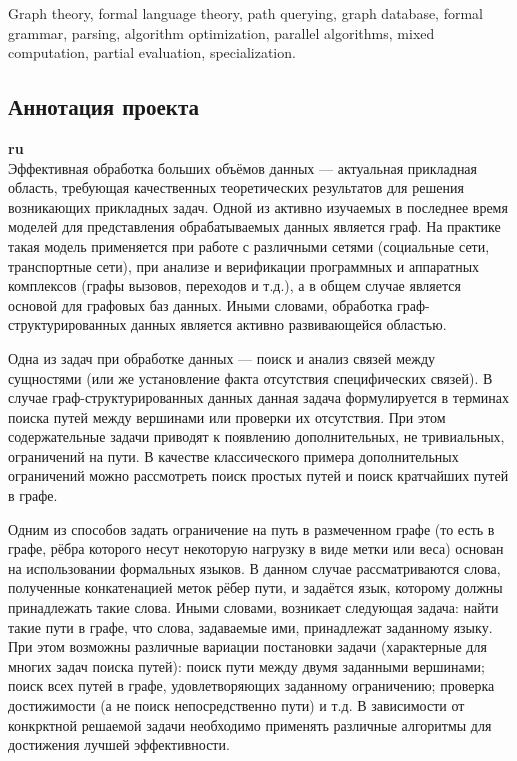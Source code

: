 \documentclass[12pt]{article}  %
\theoremstyle{remark}
\begin{document}
Graph theory, formal language theory, path querying, graph database, formal grammar, parsing, algorithm optimization, parallel algorithms, mixed computation, partial evaluation, specialization.



\subsection{Аннотация проекта}
\textbf{ru}\\
%
Эффективная обработка больших объёмов данных --- актуальная прикладная область, требующая качественных теоретических результатов для решения возникающих прикладных задач.
Одной из активно изучаемых в последнее время моделей для представления обрабатываемых данных является граф.
На практике такая модель применяется при работе с различными сетями (социальные сети, транспортные сети), при анализе и верификации программных и аппаратных комплексов (графы вызовов, переходов и т.д.), а в общем случае является основой для графовых баз данных.
Иными словами, обработка граф-структурированных данных является активно развивающейся областью.

Одна из задач при обработке данных --- поиск и анализ связей между сущностями (или же установление факта отсутствия специфических связей).
В случае граф-структурированных данных данная задача формулируется в терминах поиска путей между вершинами или проверки их отсутствия.
При этом содержательные задачи приводят к появлению дополнительных, не тривиальных, ограничений на пути.
В качестве классического примера дополнительных ограничений можно рассмотреть поиск простых путей и поиск кратчайших путей в графе.

Одним из способов задать ограничение на путь в размеченном графе (то есть в графе, рёбра которого несут некоторую нагрузку в виде метки или веса) основан на использовании формальных языков.
В данном случае рассматриваются слова, полученные конкатенацией меток рёбер пути, и задаётся язык, которому должны принадлежать такие слова.
Иными словами, возникает следующая задача: найти такие пути в графе, что слова, задаваемые ими, принадлежат заданному языку.
При этом возможны различные вариации постановки задачи (характерные для многих задач поиска путей): поиск пути между двумя заданными вершинами; поиск всех путей в графе, удовлетворяющих заданному ограничению; проверка достижимости (а не поиск непосредственно пути) и т.д.
В зависимости от конкрктной решаемой задачи необходимо применять различные алгоритмы для достижения лучшей эффективности.
\end{document}
